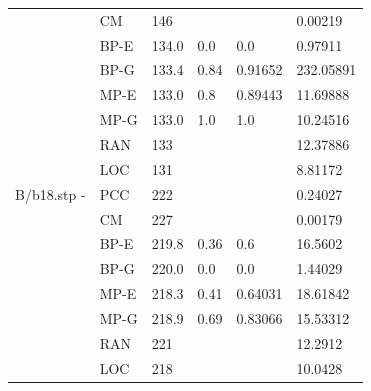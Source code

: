 \documentclass[12pt,a4paper]{article}
\begin{document}
\begin{center}
\begin{tabular}{l|l|l|l|l|l}
		&CM&146&&&0.00219\\
		&BP-E&134.0&0.0&0.0&0.97911\\
		&BP-G&133.4&0.84&0.91652&232.05891\\
		&MP-E&133.0&0.8&0.89443&11.69888\\
		&MP-G&133.0&1.0&1.0&10.24516\\
		&RAN&133&&&12.37886\\
		&LOC&131&&&8.81172\\\hline
		B/b18.stp - &PCC&222&&&0.24027\\
		&CM&227&&&0.00179\\
		&BP-E&219.8&0.36&0.6&16.5602\\
		&BP-G&220.0&0.0&0.0&1.44029\\
		&MP-E&218.3&0.41&0.64031&18.61842\\
		&MP-G&218.9&0.69&0.83066&15.53312\\
		&RAN&221&&&12.2912\\
		&LOC&218&&&10.0428\\\hline
	\end{tabular}
\end{center}
\end{document}
